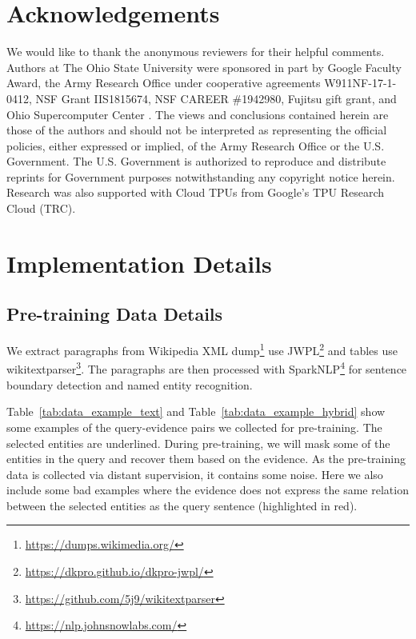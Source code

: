 \documentclass[11pt]{article}
\begin{document}
\section*{Acknowledgements}
We would like to thank the anonymous reviewers for their helpful comments. Authors at The Ohio State University were sponsored in part by Google Faculty Award, the Army Research Office under cooperative agreements W911NF-17-1-0412, NSF Grant IIS1815674, NSF CAREER \#1942980, Fujitsu gift grant, and Ohio Supercomputer Center \cite{OhioSupercomputerCenter1987}. The views and conclusions contained herein are those of the authors and should not be interpreted as representing the official policies, either expressed or implied, of the Army Research Office or the U.S. Government. The U.S. Government is authorized to reproduce and distribute reprints for Government purposes notwithstanding any copyright notice herein. Research was also supported with Cloud TPUs from Google's TPU Research Cloud (TRC).



\clearpage
\appendix

\section{Implementation Details}
\subsection{Pre-training Data Details}
\label{sec:data_detail}
We extract paragraphs from Wikipedia XML dump\footnote{\url{https://dumps.wikimedia.org/}} use JWPL\footnote{\url{https://dkpro.github.io/dkpro-jwpl/}} and tables use wikitextparser\footnote{\url{https://github.com/5j9/wikitextparser}}. The paragraphs are then processed with SparkNLP\footnote{\url{https://nlp.johnsnowlabs.com/}} for sentence boundary detection and named entity recognition. 

Table~\ref{tab:data_example_text} and Table~\ref{tab:data_example_hybrid} show some examples of the query-evidence pairs we collected for pre-training. The selected entities are underlined. During pre-training, we will mask some of the entities in the query and recover them based on the evidence. As the pre-training data is collected via distant supervision, it contains some noise. Here we also include some bad examples where the evidence does not express the same relation between the selected entities as the query sentence (highlighted in red).
\end{document}
